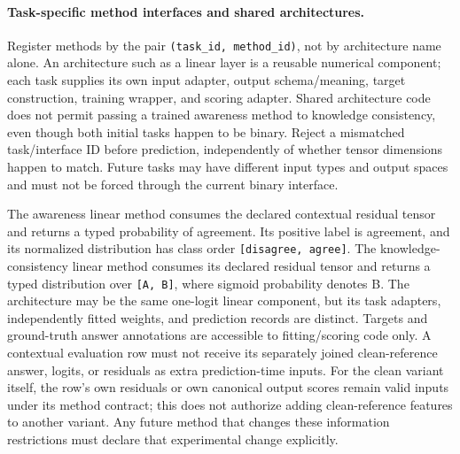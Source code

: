 \documentclass[11pt]{article}
\begin{document}
\paragraph{Task-specific method interfaces and shared architectures.}
Register methods by the pair \texttt{(task\_id, method\_id)}, not by architecture name alone.
An architecture such as a linear layer is a reusable numerical component; each task supplies its own input adapter, output schema/meaning, target construction, training wrapper, and scoring adapter.
Shared architecture code does not permit passing a trained awareness method to knowledge consistency, even though both initial tasks happen to be binary.
Reject a mismatched task/interface ID before prediction, independently of whether tensor dimensions happen to match.
Future tasks may have different input types and output spaces and must not be forced through the current binary interface.

The awareness linear method consumes the declared contextual residual tensor and returns a typed probability of agreement.
Its positive label is agreement, and its normalized distribution has class order \texttt{[disagree, agree]}.
The knowledge-consistency linear method consumes its declared residual tensor and returns a typed distribution over \texttt{[A, B]}, where sigmoid probability denotes B.
The architecture may be the same one-logit linear component, but its task adapters, independently fitted weights, and prediction records are distinct.
Targets and ground-truth answer annotations are accessible to fitting/scoring code only.
A contextual evaluation row must not receive its separately joined clean-reference answer, logits, or residuals as extra prediction-time inputs.
For the clean variant itself, the row's own residuals or own canonical output scores remain valid inputs under its method contract; this does not authorize adding clean-reference features to another variant.
Any future method that changes these information restrictions must declare that experimental change explicitly.
\end{document}

